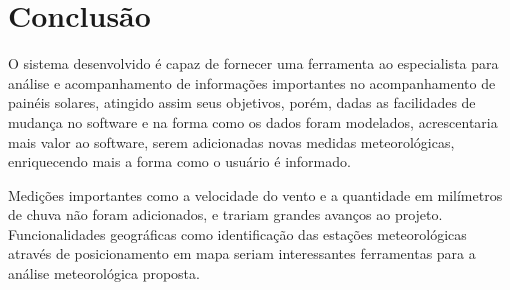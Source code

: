 \chapter{Conclusão}

O sistema desenvolvido é capaz de fornecer uma ferramenta ao especialista para análise e acompanhamento de informações importantes no acompanhamento de painéis solares, atingido assim seus objetivos, porém, dadas as facilidades de mudança no software e na forma como os dados foram modelados, acrescentaria mais valor ao software, serem adicionadas novas medidas meteorológicas, enriquecendo mais a forma como o usuário é informado.

Medições importantes como a velocidade do vento e a quantidade em milímetros de chuva não foram adicionados, e trariam grandes avanços ao projeto. Funcionalidades geográficas como identificação das estações meteorológicas através de posicionamento em mapa seriam interessantes ferramentas para a análise meteorológica proposta.
